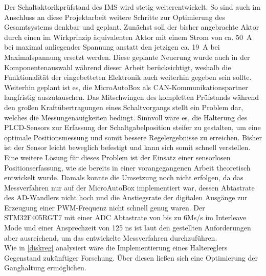 Der Schaltaktorikprüfstand des IMS wird stetig weiterentwickelt. So sind auch im Anschluss an diese Projektarbeit weitere Schritte zur Optimierung des Gesamtsystems denkbar und geplant. Zunächst soll der bisher angebrachte Aktor durch einen im Wirkprinzip äquivalenten Aktor mit einem Strom von ca. \SI{50}{A} bei maximal anliegender Spannung anstatt den jetzigen ca. \SI{19}{A} bei Maximalspannung ersetzt werden. Diese geplante Neuerung wurde auch in der Komponentenauswahl während dieser Arbeit  berücksichtigt, weshalb die Funktionalität der eingebetteten Elektronik auch weiterhin gegeben sein sollte. Weiterhin geplant ist es, die MicroAutoBox als CAN-Kommunikationspartner langfristig auszutauschen.
Das Mitschwingen des kompletten Prüfstands während den großen Kraftübertragungen eines Schaltvorgangs stellt ein Problem dar, welches die Messungenauigkeiten bedingt. 
Sinnvoll wäre es, die Halterung des PLCD-Sensors zur Erfassung der Schaltgabelposition steifer zu gestalten, um eine optimale Positionsmessung und somit bessere Regelergebnisse zu erreichen. Bisher ist der Sensor leicht beweglich befestigt und kann sich somit schnell verstellen. Eine weitere Lösung für dieses Problem ist der Einsatz einer sensorlosen Positionserfassung, wie sie bereits in einer vorangegangenen Arbeit \cite{adp} theoretisch entwickelt wurde. Damals konnte die Umsetzung noch nicht erfolgen, da das Messverfahren nur auf der MicroAutoBox implementiert war, dessen Abtastrate des AD-Wandlers nicht hoch und die Anstiegsrate der digitalen Ausgänge zur Erzeugung einer PWM-Frequenz nicht schnell genug waren. Der STM32F405RGT7 mit einer ADC Abtastrate von bis zu 6Ms/s im Interleave Mode und einer Ansprechzeit von 125 ns ist laut den gestellten Anforderungen aber ausreichend, um das entwickelte Messverfahren durchzuführen.\\
Wie in \autoref{diskreg} analysiert wäre die Implementierung eines Haltereglers Gegenstand zukünftiger Forschung. Über diesen ließen sich eine Optimierung der Ganghaltung ermöglichen. 

